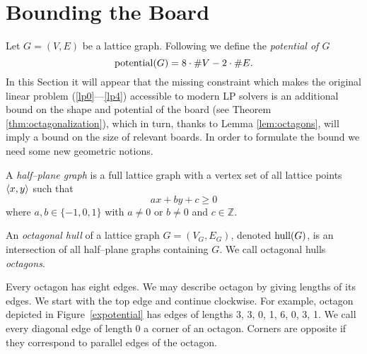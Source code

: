 \section{Bounding the Board}
\label{board_bound}

Let $G = (V, E)$ be a lattice graph. Following \cite{demaine} we define the \emph{potential of $G$}
\[
  \operatorname{potential}(G) = 8 \cdot \# V - 2 \cdot \# E.
\]
In this Section it will appear that the missing constraint which makes the original linear problem (\ref{lp0}---\ref{lp4}) accessible to modern LP solvers is an additional bound on the shape and potential of the board (see Theorem \ref{thm:octagonalization}), which in turn, thanks to  Lemma \ref{lem:octagons}, will imply a bound on the size of relevant boards. In order to formulate the bound we need some new geometric notions. 

A {\em half--plane graph} is a full lattice graph with a vertex set of all lattice points ${\langle} x,y{\rangle}$ such that \[ax+by+c\geq 0\] where $a,b\in \{-1,0,1\}$ with $a \neq 0$ or $b \neq 0$ and $c\in{\mathbb Z}$.

An \emph{octagonal hull} of a lattice graph $G = (V_G, E_G)$, denoted $\operatorname{hull}(G)$, is an intersection of all half--plane graphs containing $G$.%
We call octagonal hulls \emph{octagons}.

Every octagon has eight edges. We may describe octagon by giving lengths of its edges. We start with the top edge and continue clockwise. For example, octagon depicted in Figure~\ref{expotential} has edges of lengths 3, 3, 0, 1, 6, 0, 3, 1. We call every diagonal edge of length $0$ a corner of an octagon. Corners are opposite if they correspond to parallel edges of the octagon.


%




